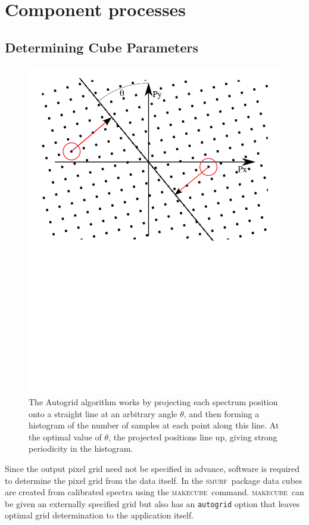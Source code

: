 \documentclass[useAMS,usenatbib]{mn2e}
\newcommand{\smurf}{\textsc{smurf}}
\newcommand{\makecube}{\textsc{makecube}}
\begin{document}
\section{Component processes}

\subsection{Determining Cube Parameters}
\label{sec:makecube}

\begin{figure}
\includegraphics[width=\columnwidth]{autogrid}
\caption{The Autogrid algorithm works by projecting each spectrum
  position onto a straight line at an arbitrary angle $\theta$, and then
  forming a histogram of the number of samples at each point along
  this line. At the optimal value of $\theta$, the projected positions
  line up, giving strong periodicity in the histogram.}
\label{fig:autogrid}
\end{figure}

Since the output pixel grid need not be specified in advance, software
is required to determine the pixel grid from the data itself. In the
\smurf\ package data cubes are created from calibrated spectra using the
\makecube\ command. \makecube\ can be given an externally specified
grid but also has an \texttt{autogrid} option that leaves optimal grid
determination to the application itself.
\end{document}
